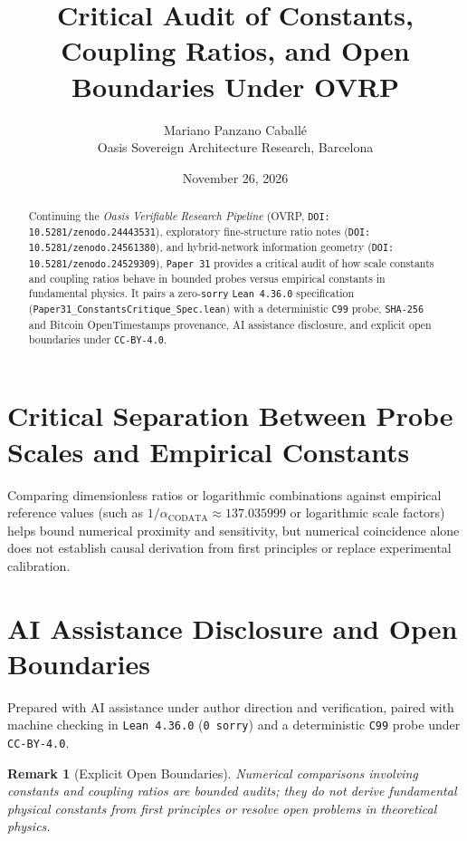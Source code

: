 \documentclass[11pt,a4paper]{article}
\title{Critical Audit of Constants, Coupling Ratios, and Open Boundaries Under OVRP}
\author{Mariano Panzano Caball\'e \\ \small Oasis Sovereign Architecture Research, Barcelona}
\date{November 26, 2026}
\newtheorem{remark}{Remark}
\begin{document}
\maketitle

\begin{abstract}
Continuing the \emph{Oasis Verifiable Research Pipeline} (OVRP, \texttt{DOI: 10.5281/zenodo.24443531}), exploratory fine-structure ratio notes (\texttt{DOI: 10.5281/zenodo.24561380}), and hybrid-network information geometry (\texttt{DOI: 10.5281/zenodo.24529309}), \texttt{Paper~31} provides a critical audit of how scale constants and coupling ratios behave in bounded probes versus empirical constants in fundamental physics. It pairs a zero-\texttt{sorry} \texttt{Lean~4.36.0} specification (\texttt{Paper31\_ConstantsCritique\_Spec.lean}) with a deterministic \texttt{C99} probe, \texttt{SHA-256} and Bitcoin OpenTimestamps provenance, AI assistance disclosure, and explicit open boundaries under \texttt{CC-BY-4.0}.
\end{abstract}

\section{Critical Separation Between Probe Scales and Empirical Constants}
Comparing dimensionless ratios or logarithmic combinations against empirical reference values (such as $1/\alpha_{\mathrm{CODATA}} \approx 137.035999$ or logarithmic scale factors) helps bound numerical proximity and sensitivity, but numerical coincidence alone does not establish causal derivation from first principles or replace experimental calibration.

\section*{AI Assistance Disclosure and Open Boundaries}
Prepared with AI assistance under author direction and verification, paired with machine checking in \texttt{Lean~4.36.0} (\texttt{0~sorry}) and a deterministic \texttt{C99} probe under \texttt{CC-BY-4.0}.

\begin{remark}[Explicit Open Boundaries]
Numerical comparisons involving constants and coupling ratios are bounded audits; they do not derive fundamental physical constants from first principles or resolve open problems in theoretical physics.
\end{remark}
\end{document}
